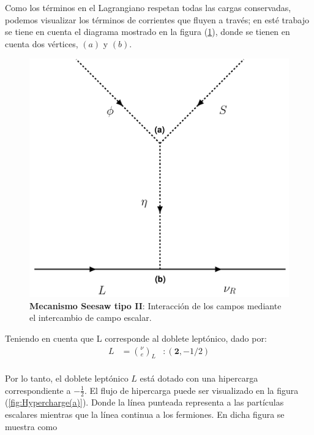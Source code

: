 \documentclass[12pt]{article}
\begin{document}
Como los términos en el Lagrangiano respetan todas las cargas conservadas, podemos visualizar los términos de corrientes que fluyen %
a través; en esté trabajo se tiene en cuenta el diagrama mostrado en la figura (\ref{fig:Majorana}),  donde se tienen en cuenta dos vértices, $(a)$ y $(b)$. \\

\begin{figure}[h!]
  \begin{center}
  \includegraphics[scale=0.6]{DiracSeeSAWdiagram.pdf}
\caption{{\textbf{Mecanismo Seesaw tipo II}: Interacción de los campos mediante el intercambio de campo escalar.}}
\label{fig:Majorana}
\end{center}
\end{figure}

Teniendo en cuenta que L corresponde al doblete leptónico, dado por:\\ 


\begin{equation}
\begin{aligned}
    \label{eq:DobleteL}
      L & = \binom{\nu}{e}_L & :  (\textbf{2}, -1/2)  
\end{aligned}
\end{equation}\\

Por lo tanto, el doblete leptónico $L$ está dotado con una hipercarga correspondiente a $-\frac{1}{2}$. El flujo de hipercarga puede ser visualizado en la figura (\ref{fig:Hypercharge(a)}). Donde la línea punteada representa a las partículas escalares mientras que la línea continua a los fermiones. En dicha figura se muestra como  \\
\end{document}
